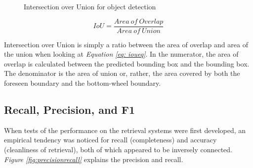 \begin{figure}[h]
  \centering
  \hfill
  \caption{Intersection over Union for object detection \cite{rosebrock_intersection_2016}}
  \label{figure: iou}
\end{figure}

\begin{equation}
  IoU = \frac{Area\ of\ Overlap}{Area\ of\ Union} \label{eq: ioueq}
\end{equation}
\vspace{0.5cm}

Intersection over Union is simply a ratio between the area of overlap and area of the union when looking at \textit{Equation \ref{eq: ioueq}}.
In the numerator, the area of overlap is calculated between the predicted bounding box and the bounding box.
The denominator is the area of union or, rather, the area covered by both the foreseen boundary and the bottom-wheel boundary\cite{uavs_comparing_2019}.
\subsection{Recall, Precision, and F1}
When tests of the performance on the retrieval systems were first developed, an empirical tendency was noticed for recall (completeness) and accuracy (cleanliness of retrieval), both of which appeared to be inversely connected\cite{buckland_relationship_1994}. \textit{Figure \ref{fig:precisionrecall}} explains the precision and recall.



